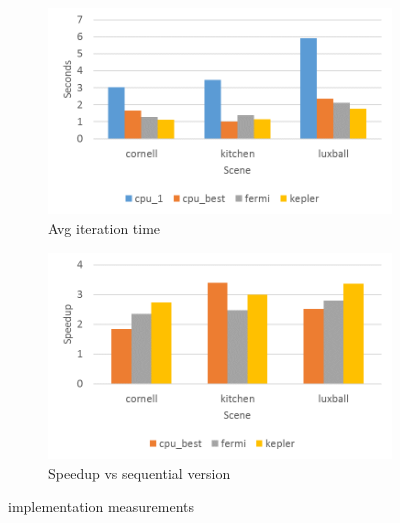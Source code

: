 \documentclass[main.tex]{subfiles}
\begin{document}
\begin{figure}[!htp]
  \centering
  \begin{subfigure}{.5\textwidth}
    \centering
    \includegraphics[width=\linewidth]{profiling/gpu_time}
    \caption{Avg iteration time} \label{fig:prof:cuda_time}
  \end{subfigure}%
  \begin{subfigure}{.5\textwidth}
    \centering
    \includegraphics[width=\linewidth]{profiling/gpu_speedup}
    \caption{Speedup vs sequential version} \label{fig:prof:cuda_speedup}
  \end{subfigure}
  \caption{\cuda implementation measurements} \label{fig:prof:cuda}
\end{figure}
\end{document}
